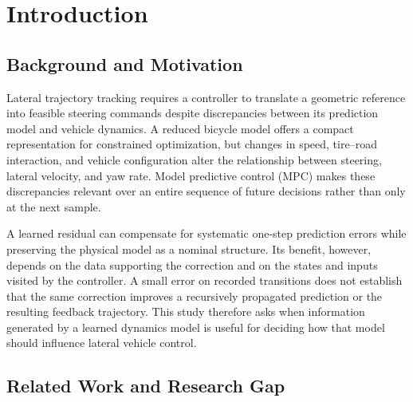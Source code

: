 \documentclass[10pt,journal]{IEEEtran}
\begin{document}
\section{Introduction}
\label{sec:introduction}

\subsection{Background and Motivation}
Lateral trajectory tracking requires a controller to translate a geometric reference into feasible steering commands despite discrepancies between its prediction model and vehicle dynamics. A reduced bicycle model offers a compact representation for constrained optimization, but changes in speed, tire--road interaction, and vehicle configuration alter the relationship between steering, lateral velocity, and yaw rate. Model predictive control (MPC) makes these discrepancies relevant over an entire sequence of future decisions rather than only at the next sample.

A learned residual can compensate for systematic one-step prediction errors while preserving the physical model as a nominal structure. Its benefit, however, depends on the data supporting the correction and on the states and inputs visited by the controller. A small error on recorded transitions does not establish that the same correction improves a recursively propagated prediction or the resulting feedback trajectory. This study therefore asks when information generated by a learned dynamics model is useful for deciding how that model should influence lateral vehicle control.

\subsection{Related Work and Research Gap}
%
\end{document}
